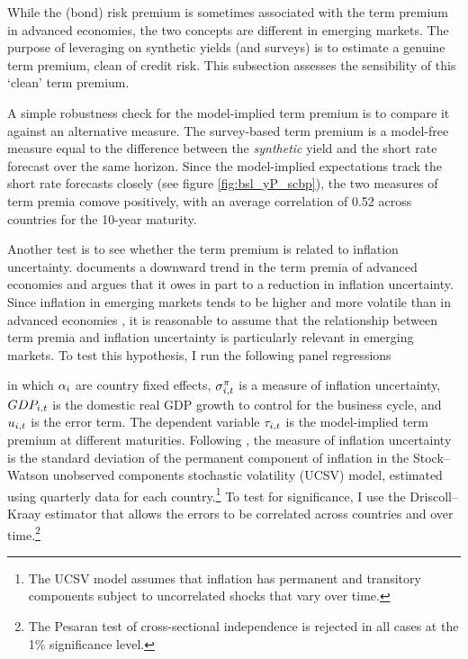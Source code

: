 {While the (bond) risk premium is sometimes associated with the term premium in advanced economies, the two concepts are different in emerging markets. 
The purpose of leveraging on synthetic yields (and surveys) is to estimate a genuine term premium, clean of credit risk. 
This subsection assesses the sensibility of this `clean' term premium.

A simple robustness check for the model-implied term premium is to compare it against an alternative measure. 
The survey-based term premium is a model-free measure equal to the difference between the \textit{synthetic} yield and the short rate forecast over the same horizon. 
Since the model-implied expectations track the short rate forecasts closely (see figure \ref{fig:bsl_yP_scbp}), the two measures of term premia comove positively, with an average correlation of 0.52 across countries for the 10-year maturity. 

Another test is to see whether the term premium is related to inflation uncertainty.
\cite{Wright:2011} documents a downward trend in the term premia of advanced economies and argues that it owes in part to a reduction in inflation uncertainty. 
Since inflation in emerging markets tends to be higher and more volatile than in advanced economies \citep{HaKoseOhnsorge:2019}, it is reasonable to assume that the relationship between term premia and inflation uncertainty is particularly relevant in emerging markets. 
To test this hypothesis, I run the following panel regressions %

\noindent in which \(\alpha_{i}\) are country fixed effects, \(\sigma^{\pi}_{i,t}\) is a measure of inflation uncertainty, \(GDP_{i,t}\) is the domestic real GDP growth to control for the business cycle, 
and \(u_{i,t}\) is the error term. 
The dependent variable \(\tau_{i,t}\) is the model-implied term premium at different maturities.
Following \cite{Wright:2011}, the measure of inflation uncertainty is the standard deviation of the permanent component of inflation in the Stock--Watson unobserved components stochastic volatility (UCSV) model, estimated using quarterly data for each country.\footnote{ The UCSV model assumes that inflation has permanent and transitory components subject to uncorrelated shocks that vary over time.} 
To test for significance, I use the Driscoll--Kraay estimator that allows the errors to be correlated across countries and over time.\footnote{ The Pesaran test of cross-sectional independence is rejected in all cases at the 1\% significance level.} 

}
